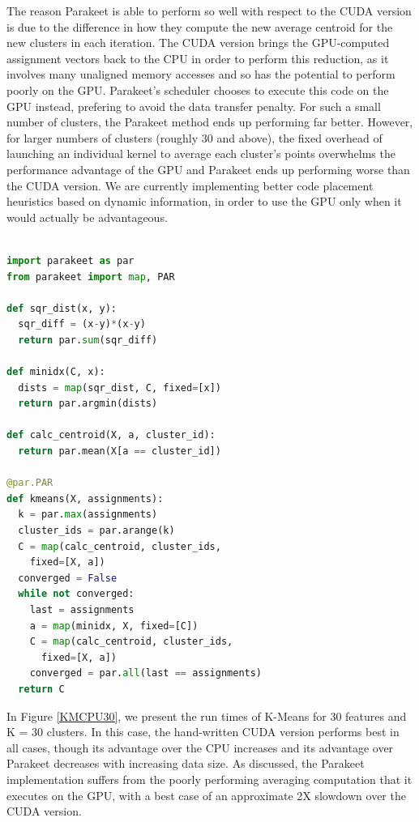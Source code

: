 \documentclass[10pt,twocolumn]{article}
\begin{document}
The reason Parakeet is able to perform so well with respect to the CUDA version is due to the difference in how they compute the new average centroid for the new clusters in each iteration.  The CUDA version brings the GPU-computed assignment vectors back to the CPU in order to perform this reduction, as it involves many unaligned memory accesses and so has the potential to perform poorly on the GPU.  Parakeet's scheduler chooses to execute this code on the GPU instead, prefering to avoid the data transfer penalty.  For such a small number of clusters, the Parakeet method ends up performing far better.  However, for larger numbers of clusters (roughly 30 and above), the fixed overhead of launching an individual kernel to average each cluster's points overwhelms the performance advantage of the GPU and Parakeet ends up performing worse than the CUDA version.  We are currently implementing better code placement heuristics based on dynamic information, in order to use the GPU only when it would actually be advantageous.
\\
\\
\begin{lstlisting}[language=Python,frame=single, label=K-Means-Code, caption={K-Means Parakeet Code}, belowskip=0.5em]
import parakeet as par
from parakeet import map, PAR

def sqr_dist(x, y):
  sqr_diff = (x-y)*(x-y)
  return par.sum(sqr_diff)

def minidx(C, x):
  dists = map(sqr_dist, C, fixed=[x])
  return par.argmin(dists)

def calc_centroid(X, a, cluster_id):
  return par.mean(X[a == cluster_id])

@par.PAR
def kmeans(X, assignments):
  k = par.max(assignments)
  cluster_ids = par.arange(k)
  C = map(calc_centroid, cluster_ids, 
    fixed=[X, a])
  converged = False
  while not converged:
    last = assignments
    a = map(minidx, X, fixed=[C])
    C = map(calc_centroid, cluster_ids, 
      fixed=[X, a])
    converged = par.all(last == assignments)
  return C
\end{lstlisting}

In Figure \ref{KMCPU30}, we present the run times of K-Means for 30 features and K = 30 clusters.  In this case, the hand-written CUDA version performs best in all cases, though its advantage over the CPU increases and its advantage over Parakeet decreases with increasing data size.  As discussed, the Parakeet implementation suffers from the poorly performing averaging computation that it executes on the GPU, with a best case of an approximate 2X slowdown over the CUDA version. 
\end{document}

